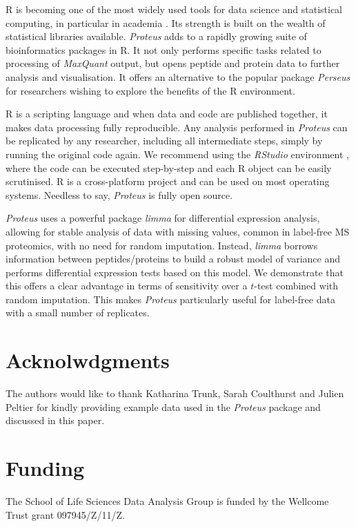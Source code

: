 \documentclass[]{article}
\begin{document}
R is becoming one of the most widely used tools for data science and
statistical computing, in particular in academia
\citep{tippmann2014, muenchen2017}. Its strength is built on the wealth
of statistical libraries available. \emph{Proteus} adds to a rapidly
growing suite of bioinformatics packages in R. It not only performs
specific tasks related to processing of \emph{MaxQuant} output, but
opens peptide and protein data to further analysis and visualisation. It
offers an alternative to the popular package \emph{Perseus} for
researchers wishing to explore the benefits of the R environment.

R is a scripting language and when data and code are published together,
it makes data processing fully reproducible. Any analysis performed in
\emph{Proteus} can be replicated by any researcher, including all
intermediate steps, simply by running the original code again. We
recommend using the \emph{RStudio} environment \citep{rstudio}, where
the code can be executed step-by-step and each R object can be easily
scrutinised. R is a cross-platform project and can be used on most
operating systems. Needless to say, \emph{Proteus} is fully open source.

\emph{Proteus} uses a powerful package \emph{limma} for differential
expression analysis, allowing for stable analysis of data with missing
values, common in label-free MS proteomics, with no need for random
imputation. Instead, \emph{limma} borrows information between
peptides/proteins to build a robust model of variance and performs
differential expression tests based on this model. We demonstrate that
this offers a clear advantage in terms of sensitivity over a \(t\)-test
combined with random imputation. This makes \emph{Proteus} particularly
useful for label-free data with a small number of replicates.

\section{Acknolwdgments}\label{acknolwdgments}

The authors would like to thank Katharina Trunk, Sarah Coulthurst and
Julien Peltier for kindly providing example data used in the
\emph{Proteus} package and discussed in this paper.

\section{Funding}\label{funding}

The School of Life Sciences Data Analysis Group is funded by the
Wellcome Trust grant 097945/Z/11/Z.

\renewcommand\refname{References}

\end{document}
